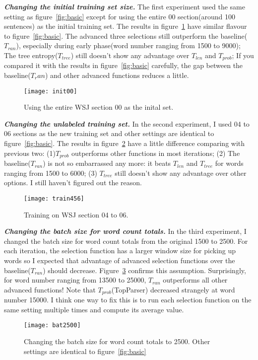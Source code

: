 \documentclass[10pt]{article}
\begin{document}
{\bf \emph{Changing the initial training set size.}} The first experiment used the same
setting as figure~\ref{fig:basic} except for using the entire 00 
section(around 100 sentences) as the initial training set. The results in 
figure~\ref{fig:init00} have similar flavour to figure~\ref{fig:basic}. The advanced
three selections still outperform the baseline($T_{ran}$), especially during early
phase(word number ranging from 1500 to 9000); The tree entropy($T_{tree}$) still doesn't show any advantage over $T_{len}$
and $T_{prob}$; If you compared it with the results in figure~\ref{fig:basic} carefully, the gap between the baseline($T_ran$) and other advanced functions reduces 
a little. 
 \begin{figure}
\centering
\texttt{[image: init00]}
\caption{Using the entire WSJ section 00 as the inital set.}\label{fig:init00}
\end{figure}

{\bf \emph{Changing the unlabeled training set.}} In the second experiment, I used 
04 to 06 sections as the new training set and other settings are identical to 
figure~\ref{fig:basic}. The results in figure~\ref{fig:train456} have a little 
difference comparing with previous two: (1)$T_{prob}$ outperforms other functions in
most iterations; (2) The baseline($T_{ran}$) is not so embarrassed any more: it 
beats $T_{len}$ and $T_{tree}$ for words ranging from 1500 to 6000; 
(3) $T_{tree}$ still doesn't show any advantage over other options. 
I still haven't figured out the reason. 
 \begin{figure}
\centering
\texttt{[image: train456]}
\caption{Training on WSJ section 04 to 06.}\label{fig:train456}
\end{figure}

{\bf \emph{Changing the batch size for word count totals.}} In the third experiment,
I changed the batch size for word count totals from the original 1500 to 2500. 
For each iteration, the selection function has a larger window size for picking up
words so I expected that advantage of advanced selection functions over the 
baseline($T_{ran}$) should decrease. Figure~\ref{fig:bat2500} confirms this assumption. 
Surprisingly, for word number ranging from 13500 to 25000, $T_{ran}$ outperforms all
other advanced functions! Note that $T_{prob}$(TopParser) decreased strangely at 
word number 15000. I think one way to fix this is to run each selection function on the
 same setting multiple times and compute its average value. 

 \begin{figure}
\centering
\texttt{[image: bat2500]}
\caption{Changing the batch size for word count totals to 2500. Other settings are identical to figure~\ref{fig:basic}}\label{fig:bat2500}
\end{figure}
\end{document}

